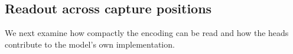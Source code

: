 \subsection{Readout across capture positions}
\label{sec:what:results}


% 

We next examine how compactly the encoding can be read and how the heads contribute to the model's own implementation.
